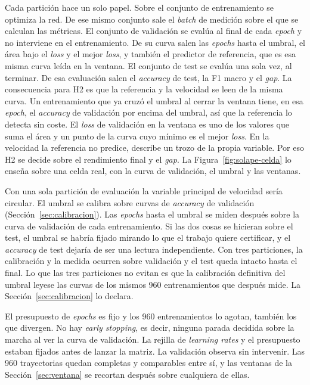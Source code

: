 Cada partición hace un solo papel. Sobre el conjunto de entrenamiento se optimiza la red. De ese mismo conjunto sale el \emph{batch} de medición sobre el que se calculan las métricas. El conjunto de validación se evalúa al final de cada \emph{epoch} y no interviene en el entrenamiento. De su curva salen las \emph{epochs} hasta el umbral, el área bajo el \emph{loss} y el mejor \emph{loss}, y también el predictor de referencia, que es esa misma curva leída en la ventana. El conjunto de test se evalúa una sola vez, al terminar. De esa evaluación salen el \emph{accuracy} de test, la F1 macro y el \emph{gap}. La consecuencia para H2 es que la referencia y la velocidad se leen de la misma curva. Un entrenamiento que ya cruzó el umbral al cerrar la ventana tiene, en esa \emph{epoch}, el \emph{accuracy} de validación por encima del umbral, así que la referencia lo detecta sin coste. El \emph{loss} de validación en la ventana es uno de los valores que suma el área y un punto de la curva cuyo mínimo es el mejor \emph{loss}. En la velocidad la referencia no predice, describe un trozo de la propia variable. Por eso H2 se decide sobre el rendimiento final y el \emph{gap}. La Figura~\ref{fig:solape-celda} lo enseña sobre una celda real, con la curva de validación, el umbral y las ventanas.

Con una sola partición de evaluación la variable principal de velocidad sería circular. El umbral se calibra sobre curvas de \emph{accuracy} de validación (Sección~\ref{sec:calibracion}). Las \emph{epochs} hasta el umbral se miden después sobre la curva de validación de cada entrenamiento. Si las dos cosas se hicieran sobre el test, el umbral se habría fijado mirando lo que el trabajo quiere certificar, y el \emph{accuracy} de test dejaría de ser una lectura independiente. Con tres particiones, la calibración y la medida ocurren sobre validación y el test queda intacto hasta el final. Lo que las tres particiones no evitan es que la calibración definitiva del umbral leyese las curvas de los mismos 960 entrenamientos que después mide. La Sección~\ref{sec:calibracion} lo declara.

El presupuesto de \emph{epochs} es fijo y los 960 entrenamientos lo agotan, también los que divergen. No hay \emph{early stopping}, es decir, ninguna parada decidida sobre la marcha al ver la curva de validación. La rejilla de \emph{learning rates} y el presupuesto estaban fijados antes de lanzar la matriz. La validación observa sin intervenir. Las 960 trayectorias quedan completas y comparables entre sí, y las ventanas de la Sección~\ref{sec:ventana} se recortan después sobre cualquiera de ellas.

